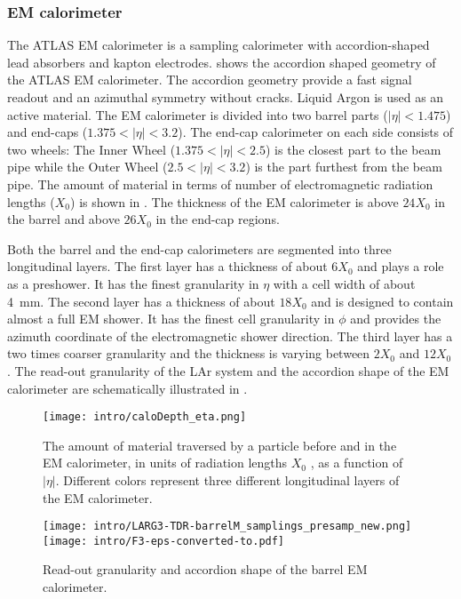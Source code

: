 \subsubsection{EM calorimeter}
The ATLAS EM calorimeter is a sampling calorimeter with accordion-shaped lead absorbers and kapton electrodes.
 shows the accordion shaped geometry of the ATLAS EM calorimeter. The accordion geometry provide a fast signal readout and an azimuthal symmetry without cracks. Liquid Argon is used as an active material. The EM calorimeter is divided into two barrel parts ($|\eta|<1.475$) and end-caps ($1.375<|\eta|<3.2$).
The end-cap calorimeter on each side consists of two wheels: The Inner Wheel ($1.375<|\eta|<2.5$) is the closest part to the beam pipe while the
Outer Wheel ($2.5<|\eta|<3.2$) is the part furthest from the beam pipe.
The amount of material in terms of number of electromagnetic radiation lengths ($X_0$) is shown in .
The thickness of the EM calorimeter is above $24 X_0$ in the barrel and above $26 X_0$ in the end-cap regions.

Both the barrel and the end-cap calorimeters are segmented into three longitudinal layers. The first layer has a thickness of about $6 X_0$ and plays a role as a preshower. It has the finest granularity in $\eta$ with a cell width of about 4~mm. The second layer has a thickness of about $18 X_0$ and is designed to contain almost a full EM shower. It has the finest cell granularity in $\phi$ and provides the azimuth coordinate of the electromagnetic shower direction. The third layer has a two times coarser granularity and the thickness is varying between $2 X_0$ and $12 X_0$. The read-out granularity of the LAr system and the accordion shape of the EM calorimeter are schematically illustrated in .

\begin{figure}[h!]
\centering
 \texttt{[image: intro/caloDepth\_eta.png]}
 \caption{
 The amount of material traversed by a particle before and in the EM calorimeter, in units of radiation lengths $X_0$ , as a function of $|\eta|$. Different colors represent three different longitudinal layers of the EM calorimeter.}
\label{fig:Calo}
\end{figure}

\begin{figure}[h!]
\centering
 \texttt{[image: intro/LARG3-TDR-barrelM\_samplings\_presamp\_new.png]}
 \texttt{[image: intro/F3-eps-converted-to.pdf]}
 \caption{Read-out granularity and accordion shape of the barrel EM calorimeter.}
\label{fig:EMgran}
\end{figure}

